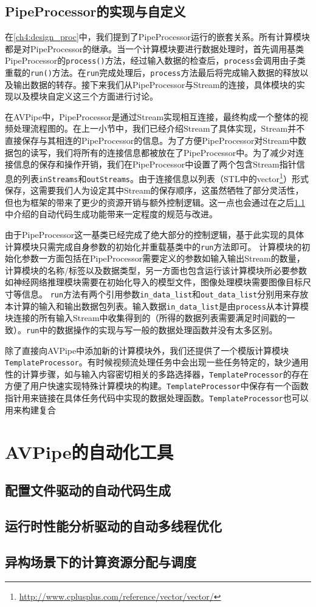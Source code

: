 \subsection{PipeProcessor的实现与自定义}
在\ref{ch4:design_proc}中，我们提到了PipeProcessor运行的嵌套关系。所有计算模块都是对PipeProcessor的继承。当一个计算模块要进行数据处理时，首先调用基类PipeProcessor的\texttt{process()}方法，经过输入数据的检查后，\texttt{process}会调用由子类重载的\texttt{run()}方法。在\texttt{run}完成处理后，\texttt{process}方法最后将完成输入数据的释放以及输出数据的转存。接下来我们从PipeProcessor与Stream的连接，具体模块的实现以及模块自定义这三个方面进行讨论。\par
在AVPipe中，PipeProcessor是通过Stream实现相互连接，最终构成一个整体的视频处理流程图的。在上一小节中，我们已经介绍Stream了具体实现，Stream并不直接保存与其相连的PipeProcessor的信息。为了方便PipeProcessor对Stream中数据包的读写，我们将所有的连接信息都被放在了PipeProcessor中。为了减少对连接信息的保存和操作开销，我们在PipeProcessor中设置了两个包含Stream指针信息的列表\texttt{inStreams}和\texttt{outStreams}。由于连接信息以列表（STL中的vector\footnote{\url{http://www.cplusplus.com/reference/vector/vector/}}）形式保存，这需要我们人为设定其中Stream的保存顺序，这虽然牺牲了部分灵活性，但也为框架的带来了更少的资源开销与额外控制逻辑。这一点也会通过在之后\ref{ch4:auto_codegen}中介绍的自动代码生成功能带来一定程度的规范与改进。\par
由于PipeProcessor这一基类已经完成了绝大部分的控制逻辑，基于此实现的具体计算模块只需完成自身参数的初始化并重载基类中的\texttt{run}方法即可。
计算模块的初始化参数一方面包括在PipeProcessor需要定义的参数如输入输出Stream的数量，计算模块的名称/标签以及数据类型，另一方面也包含运行该计算模块所必要参数如神经网络推理模块需要在初始化导入的模型文件，图像处理模块需要图像目标尺寸等信息。
\texttt{run}方法有两个引用参数\texttt{in\_data\_list}和\texttt{out\_data\_list}分别用来存放本计算的输入和输出数据包列表。输入数据\texttt{in\_data\_list}是由\texttt{process}从本计算模块连接的所有输入Stream中收集得到的（所得的数据列表需要满足时间戳的一致）。\texttt{run}中的数据操作的实现与写一般的数据处理函数并没有太多区别。\par
除了直接向AVPipe中添加新的计算模块外，我们还提供了一个模版计算模块\texttt{TemplateProcessor}。有时候视频流处理任务中会出现一些任务特定的，缺少通用性的计算步骤，如与输入内容密切相关的多路选择器，\texttt{TemplateProcessor}的存在方便了用户快速实现特殊计算模块的构建。\texttt{TemplateProcessor}中保存有一个函数指针用来链接在具体任务代码中实现的数据处理函数。\texttt{TemplateProcessor}也可以用来构建复合

\section{AVPipe的自动化工具}

\subsection{配置文件驱动的自动代码生成}\label{ch4:auto_codegen}

\subsection{运行时性能分析驱动的自动多线程优化}

\subsection{异构场景下的计算资源分配与调度}

